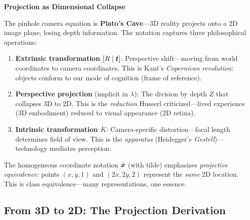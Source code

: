 \begin{philobox}
	\textbf{Projection as Dimensional Collapse}
	
	The pinhole camera equation is \textbf{Plato's Cave}---3D reality projects onto a 2D image plane, losing depth information. The notation captures three philosophical operations:
	
	\begin{enumerate}
		\item \textbf{Extrinsic transformation $[R \mid \bm{t}]$}: Perspective shift---moving from world coordinates to camera coordinates. This is Kant's \textit{Copernican revolution}: objects conform to our mode of cognition (frame of reference).
		
		\item \textbf{Perspective projection} (implicit in $\lambda$): The division by depth $Z$ that collapses 3D to 2D. This is the \textit{reduction} Husserl criticized---lived experience (3D embodiment) reduced to visual appearance (2D retina).
		
		\item \textbf{Intrinsic transformation $K$}: Camera-specific distortion---focal length determines field of view. This is the \textit{apparatus} (Heidegger's \textit{Gestell})---technology mediates perception.
	\end{enumerate}
	
	The homogeneous coordinate notation $\tilde{\bm{x}}$ (with tilde) emphasizes \textit{projective equivalence}: points $(x, y, 1)$ and $(2x, 2y, 2)$ represent the \textit{same} 2D location. This is class equivalence---many representations, one essence.
\end{philobox}

\subsection{From 3D to 2D: The Projection Derivation}


